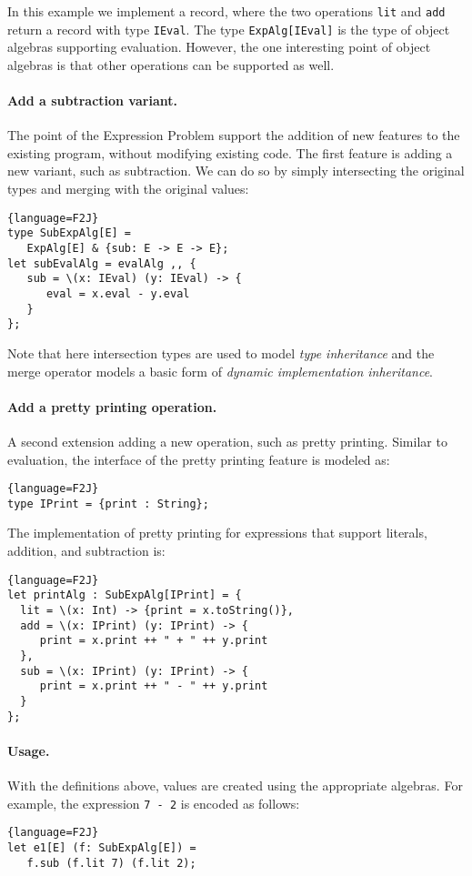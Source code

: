 In this example we implement a record, where the two operations 
\lstinline{lit} and \lstinline{add} return a record with type \lstinline{IEval}.
The type \lstinline$ExpAlg[IEval]$ is the type of object algebras
supporting evaluation. However, the one interesting point
of object algebras is that other operations can be supported as
well. 

\paragraph{Add a subtraction variant.} The point of the Expression
Problem support the addition of new features to the existing
program, without modifying existing code. 
The first feature is adding a new variant, such as subtraction. We can do so by
simply intersecting the original types and merging with the original values:
\begin{lstlisting}{language=F2J}
type SubExpAlg[E] = 
   ExpAlg[E] & {sub: E -> E -> E};
let subEvalAlg = evalAlg ,, {
   sub = \(x: IEval) (y: IEval) -> { 
      eval = x.eval - y.eval 
   }
};
\end{lstlisting}

\noindent Note that here intersection types are used to model \emph{type
  inheritance} and the merge operator models a basic form of
\emph{dynamic implementation inheritance}. 

\paragraph{Add a pretty printing operation.}
A second extension adding a new operation, such as pretty printing. 
Similar to evaluation, the interface of the pretty printing feature
is modeled as:
\begin{lstlisting}{language=F2J}
type IPrint = {print : String};
\end{lstlisting}
The implementation of pretty printing for expressions that support literals,
addition, and subtraction is:
\begin{lstlisting}{language=F2J}
let printAlg : SubExpAlg[IPrint] = {
  lit = \(x: Int) -> {print = x.toString()},
  add = \(x: IPrint) (y: IPrint) -> {
     print = x.print ++ " + " ++ y.print
  },
  sub = \(x: IPrint) (y: IPrint) -> {
     print = x.print ++ " - " ++ y.print
  }
};
\end{lstlisting}

\paragraph{Usage.}
With the definitions above, values are created using the
appropriate algebras. For example, the expression \lstinline{7 - 2} 
is encoded as follows:
\begin{lstlisting}{language=F2J}
let e1[E] (f: SubExpAlg[E]) = 
   f.sub (f.lit 7) (f.lit 2);
\end{lstlisting}

